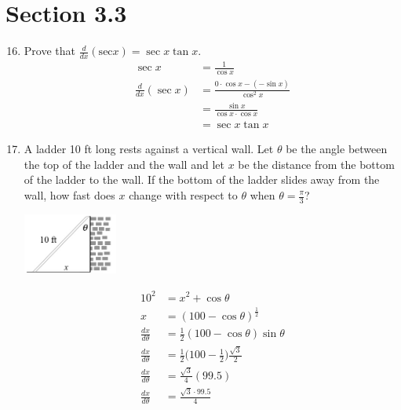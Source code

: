 \documentclass{article}
\begin{document}
\section{Section 3.3}

\begin{enumerate}
\setcounter{enumi}{15}
	\item Prove that $\frac{d}{dx}(\text{sec}x)=\sec x \tan x$.
	$$\begin{align}
		\sec x &= \frac{1}{\cos x}\\
		\frac{d}{dx} (\sec x) &= \frac{0\cdot \cos x - (-\sin x)}{\cos^2 x}\\
		&= \frac{\sin x}{\cos x \cdot \cos x} \\
		&= \boxed{\sec x \tan x}
	\end{align}$$
\setcounter{enumi}{36}
	\item 
	\begin{center}
		\begin{minipage}[t]{0.74\linewidth}
			\vspace{-0.2cm}A ladder 10 ft long rests against a vertical wall. Let $\theta$ be the angle between the top of the ladder and the wall and let $x$ be the distance from the bottom of the ladder to the wall. If the bottom of the ladder slides away from the wall, how fast does $x$ change with respect to $\theta$ when $\theta=\frac{\pi}{3}$?
		\end{minipage}
		\begin{minipage}[t]{0.25\linewidth}
			\vspace{-0.2cm} \begin{flushright}\includegraphics[height=2cm]{images/33pr37.jpg}\end{flushright}
		\end{minipage}
	\end{center}
	
	$$\begin{align}
		10^2 &= x^2 + \cos\theta \\
		x &= (100-\cos \theta)^{\frac{1}{2}} \\
		\frac{dx}{d\theta} &= \frac{1}{2}(100-\cos\theta)\sin\theta \\
		\frac{dx}{d\theta} &= \frac{1}{2}\Big(100-\frac{1}{2}\Big)\frac{\sqrt{3}}{2} \\
		\frac{dx}{d\theta} &= \frac{\sqrt{3}}{4}(99.5) \\
		\frac{dx}{d\theta} &= \boxed{\frac{\sqrt{3}\cdot 99.5}{4}}
	\end{align}$$
	
	
\end{enumerate}
\end{document}
